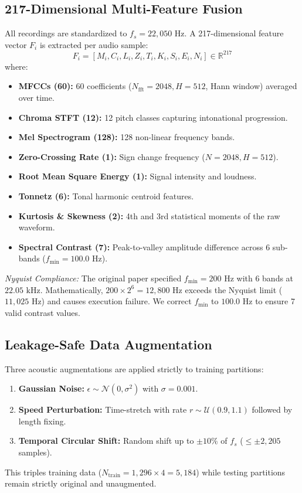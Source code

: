 \documentclass[twocolumn]{article}
\begin{document}
\subsection{217-Dimensional Multi-Feature Fusion}
All recordings are standardized to $f_s = 22,050\text{ Hz}$. A 217-dimensional feature vector $F_i$ is extracted per audio sample:
\begin{equation}
    F_i = [M_i, C_i, L_i, Z_i, T_i, K_i, S_i, E_i, N_i] \in \mathbb{R}^{217}
\end{equation}
where:
\begin{itemize}
    \item \textbf{MFCCs (60):} 60 coefficients ($N_{\text{fft}}=2048, H=512$, Hann window) averaged over time.
    \item \textbf{Chroma STFT (12):} 12 pitch classes capturing intonational progression.
    \item \textbf{Mel Spectrogram (128):} 128 non-linear frequency bands.
    \item \textbf{Zero-Crossing Rate (1):} Sign change frequency ($N=2048, H=512$).
    \item \textbf{Root Mean Square Energy (1):} Signal intensity and loudness.
    \item \textbf{Tonnetz (6):} Tonal harmonic centroid features.
    \item \textbf{Kurtosis \& Skewness (2):} 4th and 3rd statistical moments of the raw waveform.
    \item \textbf{Spectral Contrast (7):} Peak-to-valley amplitude difference across 6 sub-bands ($f_{\text{min}}=100.0\text{ Hz}$).
\end{itemize}

\textit{Nyquist Compliance:} The original paper specified $f_{\text{min}}=200\text{ Hz}$ with 6 bands at $22.05\text{ kHz}$. Mathematically, $200 \times 2^6 = 12,800\text{ Hz}$ exceeds the Nyquist limit ($11,025\text{ Hz}$) and causes execution failure. We correct $f_{\text{min}}$ to $100.0\text{ Hz}$ to ensure 7 valid contrast values.

\subsection{Leakage-Safe Data Augmentation}
Three acoustic augmentations are applied strictly to training partitions:
\begin{enumerate}
    \item \textbf{Gaussian Noise:} $\epsilon \sim \mathcal{N}(0, \sigma^2)$ with $\sigma = 0.001$.
    \item \textbf{Speed Perturbation:} Time-stretch with rate $r \sim \mathcal{U}(0.9, 1.1)$ followed by length fixing.
    \item \textbf{Temporal Circular Shift:} Random shift up to $\pm 10\%$ of $f_s$ ($\le \pm 2,205$ samples).
\end{enumerate}
This triples training data ($N_{\text{train}} = 1,296 \times 4 = 5,184$) while testing partitions remain strictly original and unaugmented.
\end{document}
